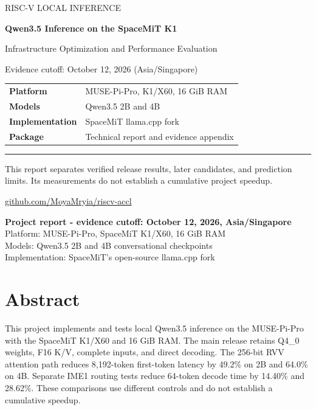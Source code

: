 \documentclass[10pt,a4paper]{article}
\begin{document}
\begin{titlepage}
\vspace*{15mm}
{\large\textcolor{reportblue}{RISC-V LOCAL INFERENCE}}\par
\vspace{12mm}
{\Huge\bfseries Qwen3.5 Inference on the SpaceMiT K1\par}
\vspace{8mm}
{\Large Infrastructure Optimization and Performance Evaluation\par}
\vspace{12mm}
{\large Evidence cutoff: October 12, 2026 (Asia/Singapore)\par}
\vspace{14mm}
\begin{tabular}{@{}ll@{}}
\textbf{Platform} & MUSE-Pi-Pro, K1/X60, 16 GiB RAM \\
\textbf{Models} & Qwen3.5 2B and 4B \\
\textbf{Implementation} & SpaceMiT llama.cpp fork \\
\textbf{Package} & Technical report and evidence appendix \\
\end{tabular}
\vfill
\textcolor{reportblue}{\rule{\textwidth}{1pt}}\par
This report separates verified release results, later candidates, and prediction limits.
Its measurements do not establish a cumulative project speedup.\par
\vspace{6mm}
\href{https://github.com/MoyaMryia/riscv-accl}{github.com/MoyaMryia/riscv-accl}
\end{titlepage}
{\small\tableofcontents}
\clearpage
\textbf{Project report - evidence cutoff: October 12, 2026,
Asia/Singapore}\\
Platform: MUSE-Pi-Pro, SpaceMiT K1/X60, 16 GiB RAM\\
Models: Qwen3.5 2B and 4B conversational checkpoints\\
Implementation: SpaceMiT's open-source llama.cpp fork

\hypertarget{abstract}{%
\section{Abstract}\label{abstract}}

This project implements and tests local Qwen3.5 inference on the
MUSE-Pi-Pro with the SpaceMiT K1/X60 and 16 GiB RAM. The main release
retains Q4\_0 weights, F16 K/V, complete inputs, and direct decoding.
The 256-bit RVV attention path reduces 8,192-token first-token latency
by 49.2\% on 2B and 64.0\% on 4B. Separate IME1 routing tests reduce
64-token decode time by 14.40\% and 28.62\%. These comparisons use
different controls and do not establish a cumulative speedup.
\end{document}
